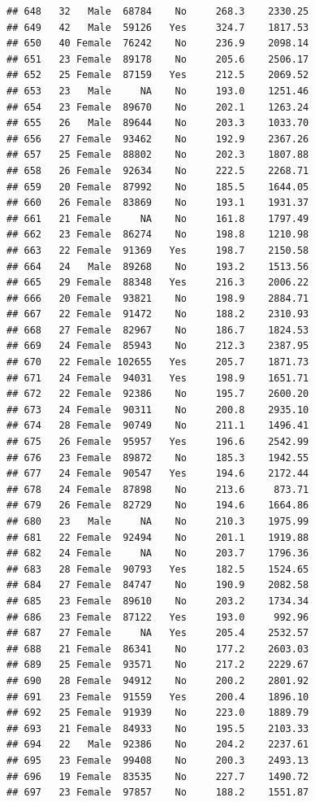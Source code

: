\documentclass[12pt,]{krantz}
\theoremstyle{definition}
\theoremstyle{definition}
\theoremstyle{remark}
\begin{document}
\begin{verbatim}
## 648   32   Male  68784    No     268.3    2330.25
## 649   42   Male  59126   Yes     324.7    1817.53
## 650   40 Female  76242    No     236.9    2098.14
## 651   23 Female  89178    No     205.6    2506.17
## 652   25 Female  87159   Yes     212.5    2069.52
## 653   23   Male     NA    No     193.0    1251.46
## 654   23 Female  89670    No     202.1    1263.24
## 655   26   Male  89644    No     203.3    1033.70
## 656   27 Female  93462    No     192.9    2367.26
## 657   25 Female  88802    No     202.3    1807.88
## 658   26 Female  92634    No     222.5    2268.71
## 659   20 Female  87992    No     185.5    1644.05
## 660   26 Female  83869    No     193.1    1931.37
## 661   21 Female     NA    No     161.8    1797.49
## 662   23 Female  86274    No     198.8    1210.98
## 663   22 Female  91369   Yes     198.7    2150.58
## 664   24   Male  89268    No     193.2    1513.56
## 665   29 Female  88348   Yes     216.3    2006.22
## 666   20 Female  93821    No     198.9    2884.71
## 667   22 Female  91472    No     188.2    2310.93
## 668   27 Female  82967    No     186.7    1824.53
## 669   24 Female  85943    No     212.3    2387.95
## 670   22 Female 102655   Yes     205.7    1871.73
## 671   24 Female  94031   Yes     198.9    1651.71
## 672   22 Female  92386    No     195.7    2600.20
## 673   24 Female  90311    No     200.8    2935.10
## 674   28 Female  90749    No     211.1    1496.41
## 675   26 Female  95957   Yes     196.6    2542.99
## 676   23 Female  89872    No     185.3    1942.55
## 677   24 Female  90547   Yes     194.6    2172.44
## 678   24 Female  87898    No     213.6     873.71
## 679   26 Female  82729    No     194.6    1664.86
## 680   23   Male     NA    No     210.3    1975.99
## 681   22 Female  92494    No     201.1    1919.88
## 682   24 Female     NA    No     203.7    1796.36
## 683   28 Female  90793   Yes     182.5    1524.65
## 684   27 Female  84747    No     190.9    2082.58
## 685   23 Female  89610    No     203.2    1734.34
## 686   23 Female  87122   Yes     193.0     992.96
## 687   27 Female     NA   Yes     205.4    2532.57
## 688   21 Female  86341    No     177.2    2603.03
## 689   25 Female  93571    No     217.2    2229.67
## 690   28 Female  94912    No     200.2    2801.92
## 691   23 Female  91559   Yes     200.4    1896.10
## 692   25 Female  91939    No     223.0    1889.79
## 693   21 Female  84933    No     195.5    2103.33
## 694   22   Male  92386    No     204.2    2237.61
## 695   23 Female  99408    No     200.3    2493.13
## 696   19 Female  83535    No     227.7    1490.72
## 697   23 Female  97857    No     188.2    1551.87

\end{verbatim}
\end{document}
